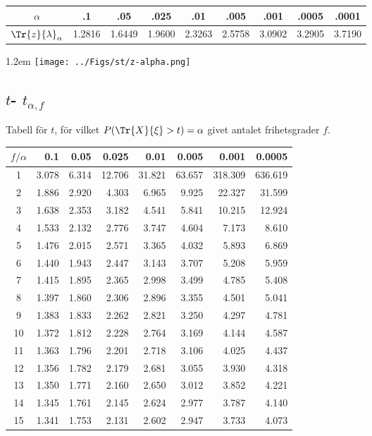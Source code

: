 \documentclass{article}
\def\myskip{\vspace{8pt plus 12pt minus 6pt}}
\begin{document}
{\begin{minipage}[b]{0.69\hsize}
\medskip
\begin{tabular}[h]{c|*{8}{c}}
  $\alpha$ & .1  &  .05  &  .025  &  .01  &  .005  &  .001  &  .0005  &  .0001 \\\hline
  $\Tr{z}{\lambda}_\alpha$ &
  1.2816 & 1.6449 & 1.9600 & 2.3263 & 2.5758 & 3.0902 & 3.2905 & 3.7190 \\
\end{tabular}
\end{minipage}
%
\hfill\lower1.2em
\hbox{\texttt{[image: ../Figs/st/z-alpha.png]}}

\myskip

\subsection*{ $t$- $t_{\alpha,f}$}%

   {Tabell för}
   $t$,
      {för vilket}
   $P(\Tr{X}{\xi} > t)=\alpha$
      {givet antalet frihetsgrader}
   $f$.

\medskip
\begin{tabular}{c|*{7}{r}}
$f / \alpha$
    &   0.1  &  0.05  & 0.025  &  0.01  & 0.005  & 0.001  & 0.0005 \\\hline
  1 &  3.078 &  6.314 & 12.706 & 31.821 & 63.657 &318.309 &636.619 \\
  2 &  1.886 &  2.920 &  4.303 &  6.965 &  9.925 & 22.327 & 31.599 \\
  3 &  1.638 &  2.353 &  3.182 &  4.541 &  5.841 & 10.215 & 12.924 \\
  4 &  1.533 &  2.132 &  2.776 &  3.747 &  4.604 &  7.173 &  8.610 \\
  5 &  1.476 &  2.015 &  2.571 &  3.365 &  4.032 &  5.893 &  6.869 \\
  6 &  1.440 &  1.943 &  2.447 &  3.143 &  3.707 &  5.208 &  5.959 \\
  7 &  1.415 &  1.895 &  2.365 &  2.998 &  3.499 &  4.785 &  5.408 \\
  8 &  1.397 &  1.860 &  2.306 &  2.896 &  3.355 &  4.501 &  5.041 \\
  9 &  1.383 &  1.833 &  2.262 &  2.821 &  3.250 &  4.297 &  4.781 \\
 10 &  1.372 &  1.812 &  2.228 &  2.764 &  3.169 &  4.144 &  4.587 \\
 11 &  1.363 &  1.796 &  2.201 &  2.718 &  3.106 &  4.025 &  4.437 \\
 12 &  1.356 &  1.782 &  2.179 &  2.681 &  3.055 &  3.930 &  4.318 \\
 13 &  1.350 &  1.771 &  2.160 &  2.650 &  3.012 &  3.852 &  4.221 \\
 14 &  1.345 &  1.761 &  2.145 &  2.624 &  2.977 &  3.787 &  4.140 \\
 15 &  1.341 &  1.753 &  2.131 &  2.602 &  2.947 &  3.733 &  4.073 \\
\end{tabular}

}
\end{document}
